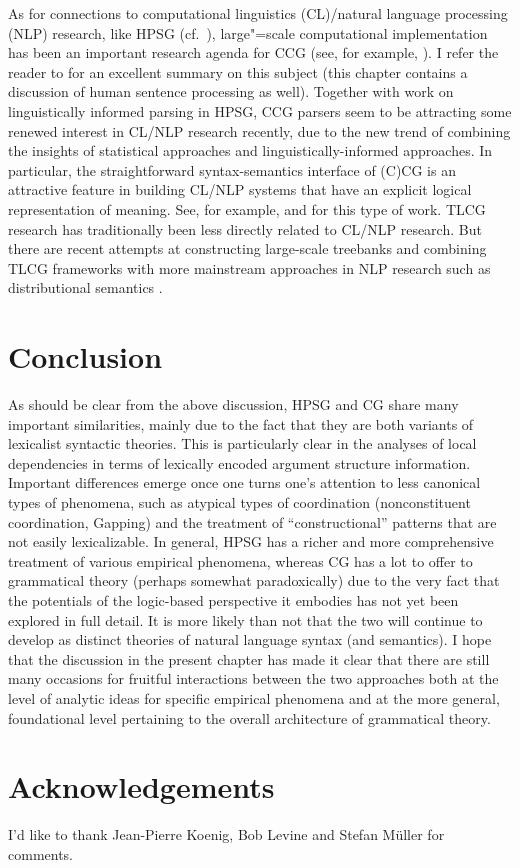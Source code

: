 \documentclass[output=paper
                ,modfonts
                ,nonflat
	        ,collection
	        ,collectionchapter
	        ,collectiontoclongg
 	        ,biblatex
                ,babelshorthands
                ,newtxmath
                ,draftmode
                ,colorlinks, citecolor=brown
]{./langsci/langscibook}
\begin{document}
As for connections to computational linguistics (CL)/natural language
processing (NLP) research, like
HPSG (cf.\ ), large"=scale computational
implementation has been an important 
research agenda for CCG (see, for example, \citealt{WhiteBaldridge2003,CC2007a-u}). I refer
the reader to \cite[Chapter 13]{steedman2012} for an excellent
summary on this subject (this chapter contains a discussion of human
sentence processing as well). Together with work on linguistically
informed parsing in HPSG, CCG parsers seem to be attracting
some renewed interest in CL/NLP research recently, due to the new trend of
combining the insights of statistical approaches and
linguistically-informed approaches. In particular, the straightforward
syntax-semantics interface of (C)CG is an attractive feature
in building CL/NLP systems that have an explicit logical
representation of meaning. See, for example, \citet{steedmanlewis13}
and \citet{mineshima-etal:2016:emnlp} 
for this type of work. TLCG research has traditionally been less
directly related to CL/NLP research. But there are recent attempts at
constructing large-scale treebanks \citep{moot2015} and combining TLCG
frameworks with more mainstream approaches in NLP research such as
distributional semantics \citep{moot2018}.


\section{Conclusion}

As should be clear from the above discussion, HPSG and CG share many
important similarities, mainly due to the fact that they are both
variants of lexicalist syntactic theories. This is particularly clear
in the analyses of local dependencies in terms of lexically encoded
argument structure information. Important differences emerge once one
turns one's attention to less canonical types of phenomena, such as
atypical types of coordination (nonconstituent coordination,
Gapping) and the treatment of ``constructional'' patterns that are not
easily lexicalizable. In general, HPSG has a richer and more
comprehensive treatment of various empirical phenomena, whereas CG has
a lot to offer to grammatical theory (perhaps somewhat paradoxically)
due to the very fact that the potentials of the logic-based
perspective it embodies has not yet been explored in full detail. It
is more likely than not that the two will continue to develop as
distinct theories of natural language syntax (and semantics). I hope
that the discussion in the present chapter has made it clear that
there are still many occasions for fruitful interactions between the
two approaches both at the level of analytic ideas for specific
empirical phenomena and at the more general, foundational level
pertaining to the overall architecture of grammatical theory.

 
\section*{Acknowledgements}

I'd like to thank Jean-Pierre Koenig, Bob Levine and Stefan M\"uller
for comments.

{\sloppy
\printbibliography[heading=subbibliography,notkeyword=this] 
}
\end{document}

